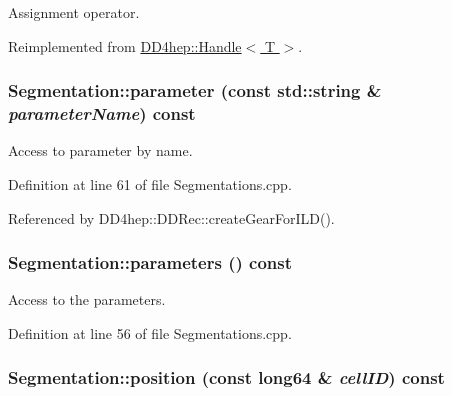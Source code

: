 Assignment operator. 

Reimplemented from \hyperlink{class_d_d4hep_1_1_handle_a9bbf8f498df42e81ad26fb00233505a6}{DD4hep::Handle$<$ T $>$}.\hypertarget{class_d_d4hep_1_1_geometry_1_1_segmentation_ab82b22908399f15baf66ed2dff02cba7}{
\subsubsection[{parameter}]{ Segmentation::parameter (const std::string \& {\em parameterName}) const}}
\label{class_d_d4hep_1_1_geometry_1_1_segmentation_ab82b22908399f15baf66ed2dff02cba7}


Access to parameter by name. 

Definition at line 61 of file Segmentations.cpp.

Referenced by DD4hep::DDRec::createGearForILD().\hypertarget{class_d_d4hep_1_1_geometry_1_1_segmentation_ab1acab9aa381fcdcab2e63114db9a27d}{
\subsubsection[{parameters}]{ Segmentation::parameters () const}}
\label{class_d_d4hep_1_1_geometry_1_1_segmentation_ab1acab9aa381fcdcab2e63114db9a27d}


Access to the parameters. 

Definition at line 56 of file Segmentations.cpp.\hypertarget{class_d_d4hep_1_1_geometry_1_1_segmentation_a3449910fbeb0c8067f75d88fa66b185f}{
\subsubsection[{position}]{ Segmentation::position (const {\bf long64} \& {\em cellID}) const}}
\label{class_d_d4hep_1_1_geometry_1_1_segmentation_a3449910fbeb0c8067f75d88fa66b185f}


